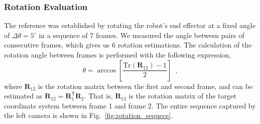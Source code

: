 \documentclass[final]{cvpr}
\begin{document}
\begin{table}[h]
\centering
{}
\caption{Displacement experiment: metrics of the distance between the centers $c_0$ and $c_1$, and the centers $c_0$ and $c_2$, using the frames acquired for displacement estimation. Here, $d(.)$ is the Euclidean distance between two 3D points.}
\label{tab:dist_metrics_points}
\end{table}



\subsubsection{Rotation Evaluation}
The reference was established by rotating the robot's end effector at a fixed angle of $\Delta \theta = 5^\circ$ in a sequence of 7 frames. We measured the angle between pairs of consecutive frames, which gives us 6 rotation estimations. The calculation of the rotation angle between frames is performed with the following expression,
%
\begin{equation}
    \theta = \arccos \left[ \dfrac{\mathrm{Tr}(\mathbf{R}_{12})-1}{2}  \right]
    \enspace,
    \label{eq:ang_estimation}
\end{equation}
%
where $\mathbf{R}_{12}$ is the rotation matrix between the first and second frame, and can be estimated as $\mathbf{R}_{12} = \mathbf{R}_1^\mathsf{T} \mathbf{R}_2$. That is, $\mathbf{R}_{12}$ is the rotation matrix of the target coordinate system between frame 1 and frame 2. The entire sequence captured by the left camera is shown in Fig.~\ref{fig:rotation_sequece}.
\end{document}
